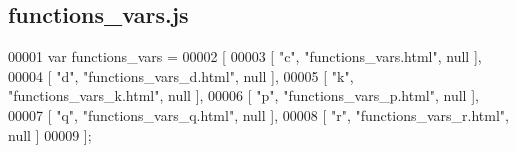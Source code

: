 \subsection{functions\+\_\+vars.\+js}
\label{functions__vars_8js_source}

\begin{DoxyCode}
00001 var functions_vars =
00002 [
00003     [ \textcolor{stringliteral}{"c"}, \textcolor{stringliteral}{"functions\_vars.html"}, null ],
00004     [ \textcolor{stringliteral}{"d"}, \textcolor{stringliteral}{"functions\_vars\_d.html"}, null ],
00005     [ \textcolor{stringliteral}{"k"}, \textcolor{stringliteral}{"functions\_vars\_k.html"}, null ],
00006     [ \textcolor{stringliteral}{"p"}, \textcolor{stringliteral}{"functions\_vars\_p.html"}, null ],
00007     [ \textcolor{stringliteral}{"q"}, \textcolor{stringliteral}{"functions\_vars\_q.html"}, null ],
00008     [ \textcolor{stringliteral}{"r"}, \textcolor{stringliteral}{"functions\_vars\_r.html"}, null ]
00009 ];
\end{DoxyCode}
